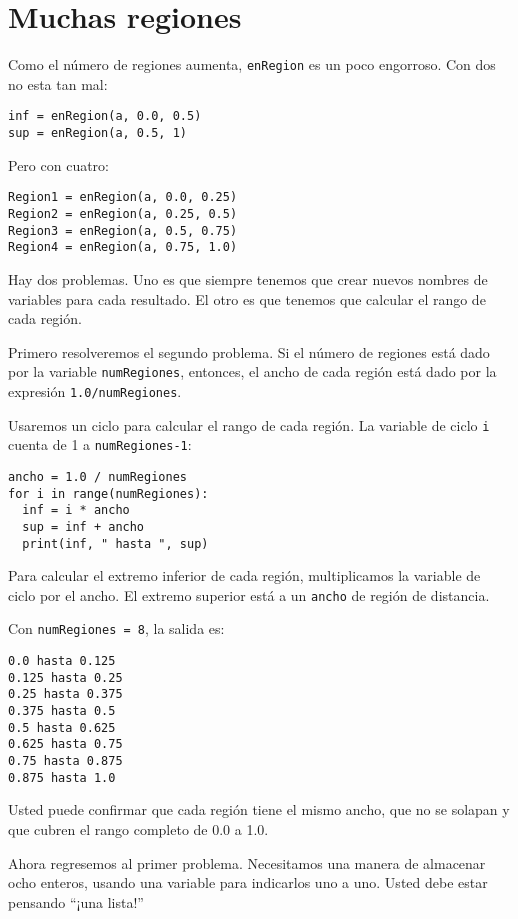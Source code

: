 \section{Muchas regiones}

\label{muchasregiones}

Como el número de regiones aumenta, \texttt{enRegion} es un poco engorroso.
Con dos no esta tan mal:
\begin{lstlisting}
inf = enRegion(a, 0.0, 0.5)
sup = enRegion(a, 0.5, 1)
\end{lstlisting}
 Pero con cuatro:
\begin{lstlisting}
Region1 = enRegion(a, 0.0, 0.25)
Region2 = enRegion(a, 0.25, 0.5)
Region3 = enRegion(a, 0.5, 0.75)
Region4 = enRegion(a, 0.75, 1.0)
\end{lstlisting}

Hay dos problemas. Uno es que siempre tenemos que crear nuevos nombres
de variables para cada resultado. El otro es que tenemos que calcular
el rango de cada región.

Primero resolveremos el segundo problema. Si el número de regiones
está dado por la variable \texttt{numRegiones}, entonces, el ancho
de cada región está dado por la expresión \texttt{1.0/numRegiones}.

Usaremos un ciclo para calcular el rango de cada región. La variable
de ciclo \texttt{i} cuenta de 1 a \texttt{numRegiones-1}:
\begin{lstlisting}
ancho = 1.0 / numRegiones
for i in range(numRegiones):
  inf = i * ancho
  sup = inf + ancho
  print(inf, " hasta ", sup)
\end{lstlisting}

Para calcular el extremo inferior de cada región, multiplicamos la
variable de ciclo por el ancho. El extremo superior está a un \texttt{ancho}
de región de distancia.

Con \texttt{numRegiones = 8}, la salida es:
\begin{verbatim}
0.0 hasta 0.125
0.125 hasta 0.25
0.25 hasta 0.375
0.375 hasta 0.5
0.5 hasta 0.625
0.625 hasta 0.75
0.75 hasta 0.875
0.875 hasta 1.0
\end{verbatim}
Usted puede confirmar que cada región tiene el mismo ancho, que no
se solapan y que cubren el rango completo de 0.0 a 1.0.

Ahora regresemos al primer problema. Necesitamos una manera de almacenar
ocho enteros, usando una variable para indicarlos uno a uno. Usted
debe estar pensando ``¡una lista!''

